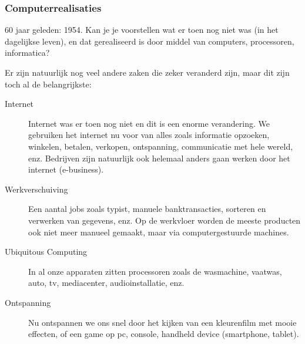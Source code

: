 \documentclass[../main.tex]{subfiles}
\begin{document}
\subsubsection{Computerrealisaties}
\begin{question}
60 jaar geleden: 1954. Kan je je voorstellen wat er toen nog niet was (in het dagelijkse leven), en dat gerealiseerd is door middel van computers, processoren, informatica?
\end{question}
\begin{solution}
Er zijn natuurlijk nog veel andere zaken die zeker veranderd zijn, maar dit zijn toch al de belangrijkste:
\begin{description}
	\item[Internet] Internet was er toen nog niet en dit is een enorme verandering. We gebruiken het internet nu voor van alles zoals informatie opzoeken, winkelen, betalen, verkopen, ontspanning, communicatie met hele wereld, enz. Bedrijven zijn natuurlijk ook helemaal anders gaan werken door het internet (e-business).
	\item[Werkverschuiving] Een aantal jobs zoals typist, manuele banktransacties, sorteren en verwerken van gegevens, enz. Op de werkvloer worden de meeste producten ook niet meer manueel gemaakt, maar via computergestuurde machines.
	\item[Ubiquitous Computing] In al onze apparaten zitten processoren zoals de wasmachine, vaatwas, auto, tv, mediacenter, audioinstallatie, enz.
	\item[Ontspanning] Nu ontspannen we ons snel door het kijken van een kleurenfilm met mooie effecten, of een game op pc, console, handheld device (smartphone, tablet).
\end{description}
\end{solution}
\end{document}
